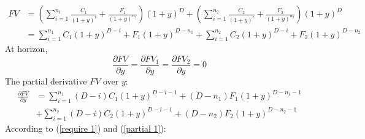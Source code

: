 \documentclass{article}
\begin{document}
    \begin{equation*}
        \begin{aligned}
            FV &= \left(\sum_{i=1}^{n_{1}} \frac{C_{1}}{(1+y)^{i}} + \frac{F_{1}}{(1+y)^{n_{1}}}\right)(1+y)^{D} + \left(\sum_{i=1}^{n_{2}} \frac{C_{2}}{(1+y)^{i}} + \frac{F_{2}}{(1+y)^{n_{2}}}\right)(1+y)^{D} \\
            &= \sum_{i=1}^{n_{1}} C_{1}(1+y)^{D-i} + F_{1}(1+y)^{D-n_{1}} + \sum_{i=1}^{n_{2}} C_{2}(1+y)^{D-i} + F_{2}(1+y)^{D-n_{2}}
        \end{aligned}
    \end{equation*}
    At horizon,
    \begin{equation}
        \label{require 1}
        \frac{\partial FV}{\partial y} = \frac{\partial FV_{1}}{\partial y}=\frac{\partial FV_{2}}{\partial y}=0
    \end{equation}
    The partial derivative $FV$ over $y$:
    \begin{equation}
        \label{partial 1}
        \begin{aligned}
            \frac{\partial FV}{\partial y} &= \sum_{i=1}^{n_{1}} (D-i)C_{1}(1+y)^{D-i-1} + (D-n_{1})F_{1}(1+y)^{D-n_{1}-1} \\& +\sum_{i=1}^{n_{2}} (D-i)C_{2}(1+y)^{D-i-1} + (D-n_{2})F_{2}(1+y)^{D-n_{2}-1}
        \end{aligned}
    \end{equation}
    According to (\ref{require 1}) and (\ref{partial 1}):
\end{document}
